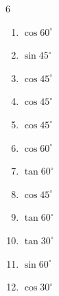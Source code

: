 \begin{multicols}{6}
\begin{enumerate}
  \item $\displaystyle \cos{60^\circ}$


  \item $\displaystyle \sin{45^\circ}$


  \item $\displaystyle \cos{45^\circ}$


  \item $\displaystyle \cos{45^\circ}$


  \item $\displaystyle \cos{45^\circ}$


\columnbreak %

\resetques

  \item $\displaystyle \cos{60^\circ}$


  \item $\displaystyle \tan{60^\circ}$


  \item $\displaystyle \cos{45^\circ}$


  \item $\displaystyle \tan{60^\circ}$


  \item $\displaystyle \tan{30^\circ}$


  \item $\displaystyle \sin{60^\circ}$


  \item $\displaystyle \cos{30^\circ}$



\end{enumerate}
\end{multicols}

